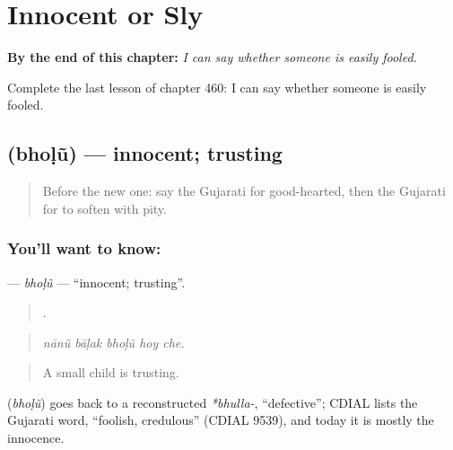 
\chapter{Innocent or Sly}
\label{ch:gu-innocent-or-sly}

\begin{chapteropening}
\textbf{By the end of this chapter:} \emph{I can say whether someone is easily fooled.}

Complete the last lesson of chapter 460: I can say whether someone is easily fooled.
\end{chapteropening}

\section[\texorpdfstring{\gu{ભોળું} (bhoḷũ)}{ભોળું (bhoḷũ)}]{ (bhoḷũ) — innocent; trusting}

\label{lesson:GU-C460-bholu}



\begin{quote}
Before the new one: say the Gujarati for good-hearted, then the Gujarati for to soften with pity.
\end{quote}

\subsection*{You'll want to know: }
\textbf{} — \emph{bhoḷũ} — \textquotedblleft{}innocent; trusting\textquotedblright{}.

\begin{quote}
    .
\end{quote}

\begin{quote}
\emph{nānũ bāḷak bhoḷũ hoy che.}
\end{quote}

\begin{quote}
A small child is trusting.
\end{quote}

\begin{cousinweb}
\textbf{} (\emph{bhoḷũ}) goes back to a reconstructed \emph{*bhulla-}, \textquotedblleft{}defective\textquotedblright{}; CDIAL lists the Gujarati word, \textquotedblleft{}foolish, credulous\textquotedblright{} (CDIAL 9539), and today it is mostly the innocence.
\end{cousinweb}

